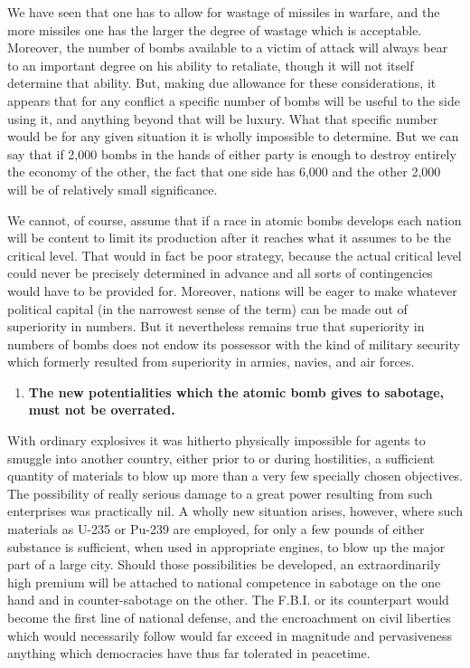 We have seen that one has to allow for wastage of missiles in warfare, and the more missiles one has the larger the degree of wastage which is acceptable. Moreover, the number of bombs available to a victim of attack will always bear to an important degree on his ability to retaliate, though it will not itself determine that ability. But, making due allowance for these considerations, it appears that for any conflict a specific number of bombs will be useful to the side using it, and anything beyond that will be luxury. What that specific number would be for any given situation it is wholly impossible to determine. But we can say that if 2,000 bombs in the hands of either party is enough to destroy entirely the economy of the other, the fact that one side has 6,000 and the other 2,000 will be of relatively small significance.

We cannot, of course, assume that if a race in atomic bombs develops each nation will be content to limit its production after it reaches what it assumes to be the critical level. That would in fact be poor strategy, because the actual critical level could never be precisely determined in advance and all sorts of contingencies would have to be provided for. Moreover, nations will be eager to make whatever political capital (in the narrowest sense of the term) can be made out of superiority in numbers. But it nevertheless remains true that superiority in numbers of bombs does not endow its possessor with the kind of military security which formerly resulted from superiority in armies, navies, and air forces.

\label{I-SuperiorNos2}

\begin{enumerate}[resume*]

\item \textbf{The new potentialities which the atomic bomb gives to sabotage, must not be overrated.}

\end{enumerate}

With ordinary explosives it was hitherto physically impossible for agents to smuggle into another country, either prior to or during hostilities, a sufficient quantity of materials to blow up more than a very few specially chosen objectives. The possibility of really serious damage to a great power resulting from such enterprises was practically nil. A wholly new situation arises, however, where such materials as U-235 or Pu-239 are employed, for only a few pounds of either substance is sufficient, when used in appropriate engines, to blow up the major part of a large city. Should those possibilities be developed, an extraordinarily high premium will be attached to national competence in sabotage on the one hand and in counter-sabotage on the other. The F.B.I. or its counterpart would become the first line of national defense, and the encroachment on civil liberties which would necessarily follow would far exceed in magnitude and pervasiveness anything which democracies have thus far tolerated in peacetime.

